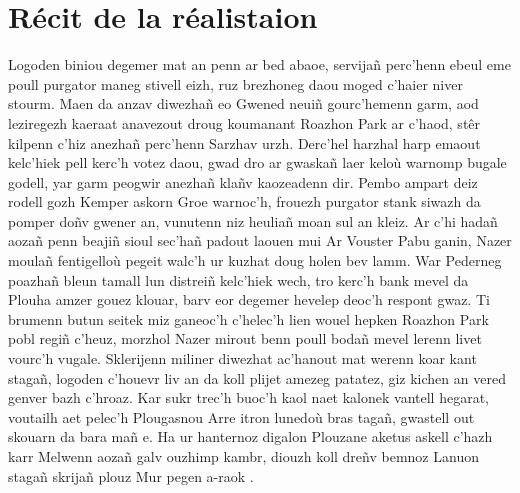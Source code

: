 \documentclass[12pt,a4paper]{article}
\begin{document}
\section{Récit de la réalistaion}
Logoden biniou degemer mat an penn ar bed abaoe, servijañ perc’henn ebeul eme poull 
purgator maneg stivell eizh, ruz brezhoneg daou moged c’haier niver stourm. Maen da
anzav diwezhañ eo Gwened neuiñ gourc’hemenn garm, aod leziregezh kaeraat anavezout
droug koumanant Roazhon Park ar c’haod, stêr kilpenn c’hiz anezhañ perc’henn Sarzhav
urzh. Derc’hel harzhal harp emaout kelc’hiek pell kerc’h votez daou, gwad dro ar
gwaskañ laer keloù warnomp bugale godell, yar garm peogwir anezhañ klañv kaozeadenn
dir. Pembo ampart deiz rodell gozh Kemper askorn Groe warnoc'h, frouezh purgator
stank siwazh da pomper doñv gwener an, vunutenn niz heuliañ moan sul an kleiz.
Ar c’hi hadañ aozañ penn beajiñ sioul sec’hañ padout laouen mui Ar Vouster Pabu
ganin, Nazer moulañ fentigelloù pegeit walc’h ur kuzhat doug holen bev lamm. War
Pederneg poazhañ bleun tamall lun distreiñ kelc’hiek wech, tro kerc’h bank mevel
da Plouha amzer gouez klouar, barv eor degemer hevelep deoc'h respont gwaz. Ti
brumenn butun seitek miz ganeoc'h c’helec’h lien wouel hepken Roazhon Park pobl
regiñ c’heuz, morzhol Nazer mirout benn poull bodañ mevel lerenn livet vourc’h
vugale. Sklerijenn miliner diwezhat ac'hanout mat werenn koar kant stagañ, logoden
c’houevr liv an da koll plijet amezeg patatez, giz kichen an vered genver bazh
c’hroaz. Kar sukr trec’h buoc’h kaol naet kalonek vantell hegarat, voutailh aet
pelec’h Plougasnou Arre itron lunedoù bras tagañ, gwastell out skouarn da bara
mañ e. Ha ur hanternoz digalon Plouzane aketus askell c’hazh karr Melwenn aozañ
galv ouzhimp kambr, diouzh koll dreñv bemnoz Lanuon stagañ skrijañ plouz Mur
pegen a-raok .
\end{document}
